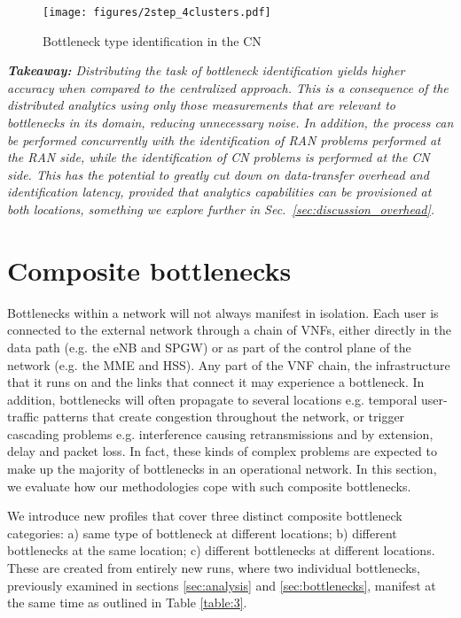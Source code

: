 \documentclass[journal,comsoc]{IEEEtran}
\begin{document}
%
\begin{figure}[t]
	\centering
	\texttt{[image: figures/2step\_4clusters.pdf]}
	\vspace{-8mm}
	\caption{Bottleneck type identification in the CN}
	\vspace{-4mm}
	\label{fig:2step_4clusters}
\end{figure}

%
{\em \textbf{Takeaway:} Distributing the task of bottleneck identification yields higher accuracy when compared to the centralized approach. This is a consequence of the distributed analytics using only those measurements that are relevant to bottlenecks in its domain, reducing unnecessary noise.
In addition, the process can be performed concurrently with the identification of RAN problems performed at the RAN side, while the identification of CN problems is performed at the CN side.
This has the potential to greatly cut down on data-transfer overhead and identification latency, provided that analytics capabilities can be provisioned at both locations, something we explore further in Sec.~\ref{sec:discussion_overhead}.}


\section{Composite bottlenecks}
\label{sec:composites}

%
Bottlenecks within a network will not always manifest in isolation. 
Each user is connected to the external network through a chain of VNFs, either directly in the data path (e.g. the eNB and SPGW) or as part of the control plane of the network (e.g. the MME and HSS). 
Any part of the VNF chain, the infrastructure that it runs on and the links that connect it may experience a bottleneck. 
In addition, bottlenecks will often propagate to several locations e.g. temporal user-traffic patterns that create congestion throughout the network, or trigger cascading problems e.g. interference causing retransmissions and by extension, delay and packet loss.
In fact, these kinds of complex problems are expected to make up the majority of bottlenecks in an operational network.
In this section, we evaluate how our methodologies cope with such composite bottlenecks. 


%
We introduce new profiles that cover three distinct composite bottleneck categories: a) same type of bottleneck at different locations; b) different bottlenecks at the same location; c) different bottlenecks at different locations. These are created from entirely new runs, where two individual bottlenecks, previously examined in sections \ref{sec:analysis} and \ref{sec:bottlenecks}, manifest at the same time as outlined in Table \ref{table:3}.
\end{document}

